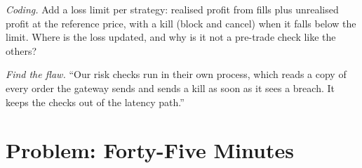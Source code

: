\begin{exercise}[$\star\star\star$]\label{exo:ll:pre-trade-risk-and-kill-switches:7}
\emph{Coding.} Add a loss limit per strategy: realised profit from fills plus unrealised profit at the reference price, with
a kill (block and cancel) when it falls below the limit. Where is the loss updated, and why is it not a pre-trade check like the
others?
\end{exercise}

\begin{exercise}[$\star\star\star$]\label{exo:ll:pre-trade-risk-and-kill-switches:8}
\emph{Find the flaw.} ``Our risk checks run in their own process, which reads a copy of every order the gateway sends and sends
a kill as soon as it sees a breach. It keeps the checks out of the latency path.''
\end{exercise}

\section{Problem: Forty-Five Minutes}

